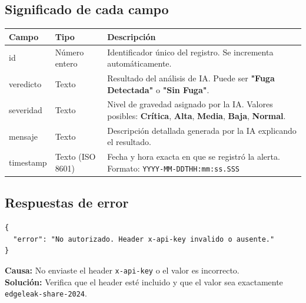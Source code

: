 \documentclass[12pt, a4paper]{article}
\begin{document}
\subsection{Significado de cada campo}

\begin{center}
\begin{tabular}{>{\ttfamily}l l p{6.5cm}}
  \toprule
  \textrm{Campo} & Tipo & Descripción \\
  \midrule
  id          & Número entero   & Identificador único del registro. Se incrementa
                                   automáticamente. \\
  \addlinespace
  veredicto   & Texto           & Resultado del análisis de IA. Puede ser
                                   \textbf{"Fuga Detectada"} o
                                   \textbf{"Sin Fuga"}. \\
  \addlinespace
  severidad   & Texto           & Nivel de gravedad asignado por la IA. Valores
                                   posibles: \textbf{Crítica}, \textbf{Alta},
                                   \textbf{Media}, \textbf{Baja}, \textbf{Normal}. \\
  \addlinespace
  mensaje     & Texto           & Descripción detallada generada por la IA
                                   explicando el resultado. \\
  \addlinespace
  timestamp   & Texto (ISO 8601)& Fecha y hora exacta en que se registró la
                                   alerta. Formato: \texttt{YYYY-MM-DDTHH:mm:ss.SSS} \\
  \bottomrule
\end{tabular}
\end{center}

\subsection{Respuestas de error}

\begin{tcolorbox}[errorbox, title={\faTimesCircle\ Error 401 — No autorizado}]
\begin{lstlisting}[style=jsonStyle]
{
  "error": "No autorizado. Header x-api-key invalido o ausente."
}
\end{lstlisting}
  \vspace{0.2cm}
  \textbf{Causa:} No enviaste el header \texttt{x-api-key} o el valor es incorrecto.\\
  \textbf{Solución:} Verifica que el header esté incluido y que el valor sea exactamente \texttt{edgeleak-share-2024}.
\end{tcolorbox}
\end{document}

